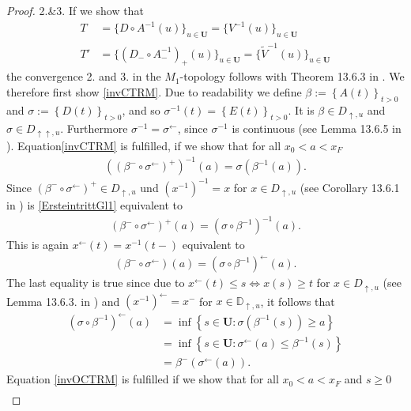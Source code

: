 \documentclass[12pt, a4paper]{article}
\newcommand{\1}{\mathbf 1}
\begin{document}
\begin{proof}
2.\&3. If we show that 
  \begin{align}
  T&=\{D \circ A^{-1}(u)\}_{u \in \mathbf U}=\{V^{-1}(u)\}_{u \in \mathbf U} \label{invCTRM}\\
  T'&= \{(D_- \circ A^{-1}_-)_+(u)\}_{u \in \mathbf U}=\{\tilde V^{-1}(u)\}_{u \in \mathbf U} \label{invOCTRM}
  \end{align}  
the convergence 2. and 3. in the $M_1$-topology follows with Theorem 13.6.3 in 
\cite{Whitt2010}. We therefore first show \eqref{invCTRM}. 
Due to readability we define $\beta:=\left\{A(t)\right\}_{t>0}$ and $\sigma:=\left\{D(t)\right\}_{t>0}$, and so $\sigma^{-1}(t)=\left\{E(t)\right\}_{t>0}$. It is $\beta \in D_{\uparrow,u}$ and $\sigma \in D_{\uparrow \uparrow,u}$. Furthermore $\sigma^{-1}=\sigma^{\leftarrow}$, since $\sigma^{-1}$ is continuous (see Lemma 13.6.5 in \cite{Whitt2010}). Equation\eqref{invCTRM} is fulfilled, if we show that for all $x_0<a<x_F$
\begin{align}
((\beta^{-} \circ \sigma^{\leftarrow})^{+})^{-1}(a)=\sigma(\beta^{-1}(a)).\label{ErsteintrittGl1}
\end{align}
Since $(\beta^{-} \circ \sigma^{\leftarrow})^{+} \in D_{\uparrow,u}$ und $(x^{-1})^{-1}=x$ for $x \in D_{\uparrow,u}$ (see Corollary 13.6.1 in \cite{Whitt2010}) is \eqref{ErsteintrittGl1} equivalent to
\begin{align*}
(\beta^{-} \circ \sigma^{\leftarrow})^{+}(a)=(\sigma \circ \beta^{-1})^{-1}(a).
\end{align*}
This is again $x^{\leftarrow}(t)=x^{-1}(t-)$ equivalent to
\begin{align*}
(\beta^{-} \circ \sigma^{\leftarrow})(a)=(\sigma \circ \beta^{-1})^{\leftarrow}(a).
\end{align*}
The last equality is true since due to $x^{\leftarrow}(t) \leq s \Leftrightarrow x(s) \geq t$ for $x \in D_{\uparrow,u}$  (see Lemma 13.6.3. in \cite{Whitt2010}) and $(x^{-1})^{\leftarrow}=x^{-}$ for $x \in \mathbb{D}_{\uparrow,u}$, it follows that
\begin{align*}
(\sigma \circ \beta^{-1})^{\leftarrow}(a)&=\inf \left\{s \in \mathbf U: \sigma(\beta^{-1}(s)) \geq a \right\}\\
&=\inf \left\{s \in \mathbf U: \sigma^{\leftarrow}(a) \leq \beta^{-1}(s)\right\}\\
&=\beta^{-}(\sigma^{\leftarrow}(a)).
\end{align*}
Equation \eqref{invOCTRM} is fulfilled if we show that for all $x_0<a<x_F$ and $s\geq  0$
\begin{align*}

\end{align*}
\end{proof}
\end{document}
